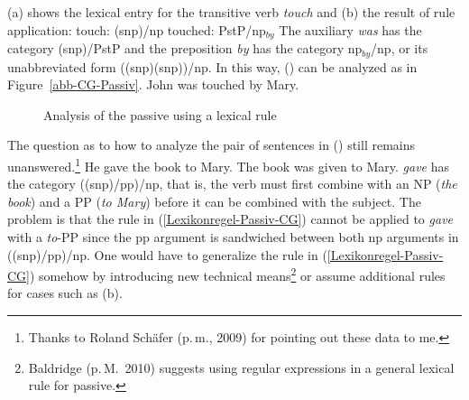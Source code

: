 (a) shows the lexical entry for the transitive verb \emph{touch} and (b) the result of rule application:
\eal
\ex touch:   (s\bs np)/np
\ex touched: PstP/np$_{by}$ 
\zl
The auxiliary \emph{was} has the category (s\bs np)/PstP and the preposition \emph{by} has the category  np$_{by}$/np, or its unabbreviated form ((s\bs np)\bs (s\bs np))/np.
In this way, () can be analyzed as in Figure~\vref{abb-CG-Passiv}.
\ea
John was touched by Mary.
\z
\begin{figure}
\centerline{%
}
\caption{\label{abb-CG-Passiv}Analysis of the passive using a lexical rule}
\end{figure}%

\noindent
\addlines
The question as to how to analyze the pair of sentences in () still remains unanswered.\footnote{
	Thanks to Roland Sch\"{a}fer (p.\,m., 2009) for pointing out these data to me.
}
\eal
\ex He gave the book to Mary.
\ex The book was given to Mary.
\zl
\emph{gave} has the category ((s\bs np)/pp)/np, that is, the verb must first combine with an NP (\emph{the
  book}) and a PP (\emph{to Mary}) before it can be combined with the subject. The problem is that the rule in (\ref{Lexikonregel-Passiv-CG}) cannot be applied to \emph{gave}
  with a \emph{to}-PP since the pp argument is sandwiched between both np arguments in ((s\bs np)/pp)/np. One would have to generalize the rule in (\ref{Lexikonregel-Passiv-CG}) somehow
  by introducing new technical means\footnote{
  Baldridge (p.\,M.\ 2010) suggests using regular expressions in a general lexical rule for passive.%
 }
  or assume additional rules for cases such as (b).

